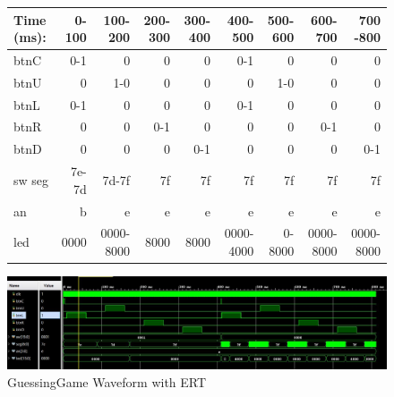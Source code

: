 \documentclass[11pt]{article}
\begin{document}
\begin{figure}[ht]\centering
	\begin{tabular}{l|rrrrrrrr}
		Time (ms): & 0-100 & 100-200 & 200-300 & 300-400 & 400-500 & 500-600 & 600-700 & 700 -800 \\
		\midrule
		btnC & 0-1 & 0   & 0      & 0   & 0-1 & 0   & 0      & 0    \\
		btnU & 0   & 1-0 & 0      & 0   & 0   & 1-0 & 0      & 0    \\ 
		btnL & 0-1 & 0   & 0      & 0   & 0-1 & 0   & 0      & 0    \\ 
		btnR & 0   & 0   & 0-1    & 0   & 0   & 0   & 0-1    & 0     \\ 
		btnD & 0   & 0   & 0      & 0-1 & 0   & 0   & 0      & 0-1   \\ 
		sw
		\midrule
		seg   & 7e-7d & 7d-7f & 7f & 7f & 7f & 7f & 7f & 7f \\
		an    & b& e  & e&e& e  & e&e& e \\
		led    & 0000  & 0000-8000   & 8000   & 8000   & 0000-4000 &   0-8000 &0000-8000   & 0000-8000  \\ 
		\bottomrule
	\end{tabular}
	\bigskip
	\includegraphics[width=1\textwidth,angle=0,origin=c]{guessinggameWaveform}
	\caption{GuessingGame Waveform with ERT}
	\label{fig:sim_with_table}
\end{figure}
\end{document}
